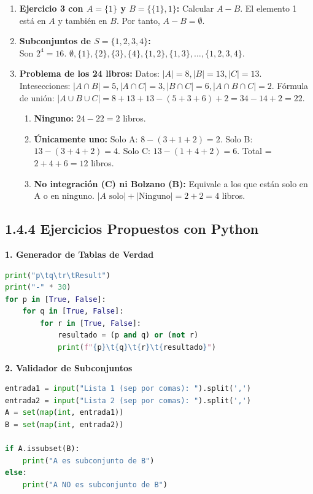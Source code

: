\documentclass[letterpaper, 12pt]{article}
\begin{document}
\begin{enumerate}
    \item \textbf{Ejercicio 3 con $A=\{1\}$ y $B=\{\{1\}, 1\}$:}
    Calcular $A - B$. El elemento 1 está en $A$ y también en $B$. Por tanto, $A - B = \emptyset$.
    
    \item \textbf{Subconjuntos de $S=\{1,2,3,4\}$:} \\
    Son $2^4 = 16$. $\emptyset, \{1\}, \{2\}, \{3\}, \{4\}, \{1,2\}, \{1,3\}, \dots, \{1,2,3,4\}$.

    \item \textbf{Problema de los 24 libros:}
    Datos: $|A|=8, |B|=13, |C|=13$. Intesecciones: $|A \cap B|=5, |A \cap C|=3, |B \cap C|=6, |A \cap B \cap C|=2$.
    Fórmula de unión:
    $|A \cup B \cup C| = 8 + 13 + 13 - (5+3+6) + 2 = 34 - 14 + 2 = 22$.
    
    \begin{enumerate}
        \item \textbf{Ninguno:} $24 - 22 = 2$ libros.
        \item \textbf{Únicamente uno:} 
        Solo A: $8 - (3+1+2) = 2$.
        Solo B: $13 - (3+4+2) = 4$.
        Solo C: $13 - (1+4+2) = 6$.
        Total = $2+4+6 = 12$ libros.
        \item \textbf{No integración (C) ni Bolzano (B):}
        Equivale a los que están solo en A o en ninguno. $|A \text{ solo}| + |\text{Ninguno}| = 2 + 2 = 4$ libros.
    \end{enumerate}
\end{enumerate}

\subsection{1.4.4 Ejercicios Propuestos con Python}

\textbf{1. Generador de Tablas de Verdad}
\begin{lstlisting}[language=Python]
print("p\tq\tr\tResult")
print("-" * 30)
for p in [True, False]:
    for q in [True, False]:
        for r in [True, False]:
            resultado = (p and q) or (not r)
            print(f"{p}\t{q}\t{r}\t{resultado}")
\end{lstlisting}

\textbf{2. Validador de Subconjuntos}
\begin{lstlisting}[language=Python]
entrada1 = input("Lista 1 (sep por comas): ").split(',')
entrada2 = input("Lista 2 (sep por comas): ").split(',')
A = set(map(int, entrada1))
B = set(map(int, entrada2))

if A.issubset(B):
    print("A es subconjunto de B")
else:
    print("A NO es subconjunto de B")
\end{lstlisting}
\end{document}
